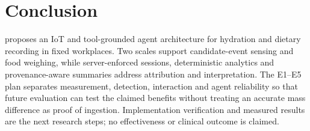 \section{Conclusion}\label{sec:conclusion}
\sys{} proposes an IoT and tool-grounded agent architecture for hydration and dietary recording in fixed workplaces. Two scales support candidate-event sensing and food weighing, while server-enforced sessions, deterministic analytics and provenance-aware summaries address attribution and interpretation. The E1--E5 plan separates measurement, detection, interaction and agent reliability so that future evaluation can test the claimed benefits without treating an accurate mass difference as proof of ingestion. Implementation verification and measured results are the next research steps; no effectiveness or clinical outcome is claimed.
